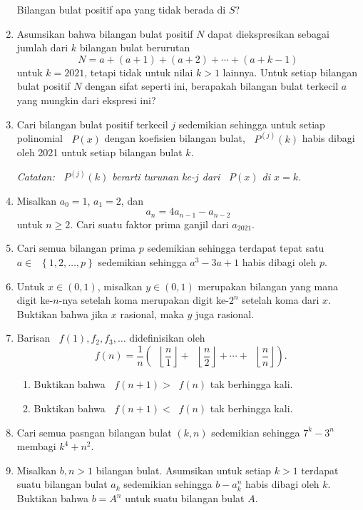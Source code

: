 \documentclass[12pt]{article}
\newcommand*\lrbr[1]{\mathop{}\!\left\lbrace#1\right\rbrace}
\newcommand*\floor[1]{\mathop{}\!\left\lfloor{#1}\right\rfloor}
\newcommand*\func[2]{\mathop{}\!{#1}{\left({#2}\right)}}
\begin{document}
\begin{enumerate}[leftmargin=*]
\begin{enumerate}
		\end{enumerate}
		Bilangan bulat positif apa yang tidak berada di $ S $?
		\item Asumsikan bahwa bilangan bulat positif $ N $ dapat diekspresikan sebagai jumlah dari $ k $ bilangan bulat berurutan
		\[ N = a + \left(a + 1\right) + \left(a + 2\right) + \cdots + \left(a + k - 1\right) \]
		untuk $ k = 2021 $, tetapi tidak untuk nilai $ k > 1 $ lainnya. Untuk setiap bilangan bulat positif $ N $ dengan sifat seperti ini, berapakah bilangan bulat terkecil $ a $ yang mungkin dari ekspresi ini?
		\item Cari bilangan bulat positif terkecil $ j $ sedemikian sehingga untuk setiap polinomial $ \func{P}{x} $ dengan koefisien bilangan bulat, $ \func{P^{\left(j\right)}}{k} $ habis dibagi oleh 2021 untuk setiap bilangan bulat $ k $.
		\par \noindent \textit{Catatan: $ \func{P^{\left(j\right)}}{k} $ berarti turunan ke-$ j $ dari $ \func{P}{x} $ di $ x = k $.}
		\item Misalkan $ a_{0} = 1 $, $ a_{1} = 2 $, dan
		\[ a_{n} = 4a_{n - 1} - a_{n - 2} \]
		untuk $ n \geq 2 $. Cari suatu faktor prima ganjil dari $ a_{2021} $.
		\item Cari semua bilangan prima $ p $ sedemikian sehingga terdapat tepat satu $ a \in \lrbr{1, 2, \dots, p} $ sedemikian sehingga $ a^{3} - 3a + 1 $ habis dibagi oleh $ p $.
		\item Untuk $ x \in \left(0, 1\right) $, misalkan $ y \in \left(0, 1\right) $ merupakan bilangan yang mana digit ke-$ n $-nya setelah koma merupakan digit ke-$ 2^{n} $ setelah koma dari $ x $. Buktikan bahwa jika $ x $ rasional, maka $ y $ juga rasional.
		\item Barisan $ \func{f}{1}, f_{2}, f_{3}, \dots $ didefinisikan oleh
		\[ \func{f}{n} = \frac{1}{n}\left(\floor{\frac{n}{1}} + \floor{\frac{n}{2}} + \cdots + \floor{\frac{n}{n}}\right). \]
		\begin{enumerate}
			\item Buktikan bahwa $ \func{f}{n + 1} > \func{f}{n} $ tak berhingga kali.
			\item Buktikan bahwa $ \func{f}{n + 1} < \func{f}{n} $ tak berhingga kali.
		\end{enumerate}
		\item Cari semua pasngan bilangan bulat $ \left(k, n\right) $ sedemikian sehingga $ 7^{k} - 3^{n} $ membagi $ k^{4} + n^{2} $.
		\item Misalkan $ b, n > 1 $ bilangan bulat. Asumsikan untuk setiap $ k > 1 $ terdapat suatu bilangan bulat $ a_{k} $ sedemikian sehingga $ b - a_{k}^{n} $ habis dibagi oleh $ k $. Buktikan bahwa $ b = A^{n} $ untuk suatu bilangan bulat $ A $.

\end{enumerate}
\end{document}
